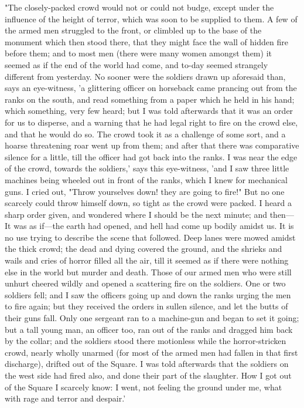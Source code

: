 "The closely-packed crowd would not or could not budge, except under the
influence of the height of terror, which was soon to be supplied to
them. A few of the armed men struggled to the front, or climbled up to
the base of the monument which then stood there, that they might face
the wall of hidden fire before them; and to most men (there were many
women amongst them) it seemed as if the end of the world had come, and
to-day seemed strangely different from yesterday. No sooner were the
soldiers drawn up aforesaid than, says an eye-witness, 'a glittering
officer on horseback came prancing out from the ranks on the south, and
read something from a paper which he held in his hand; which something,
very few heard; but I was told afterwards that it was an order for us to
disperse, and a warning that he had legal right to fire on the crowd
else, and that he would do so. The crowd took it as a challenge of some
sort, and a hoarse threatening roar went up from them; and after that
there was comparative silence for a little, till the officer had got
back into the ranks. I was near the edge of the crowd, towards the
soldiers,' says this eye-witness, 'and I saw three little machines being
wheeled out in front of the ranks, which I knew for mechanical guns. I
cried out, "Throw yourselves down! they are going to fire!" But no one
scarcely could throw himself down, so tight as the crowd were packed. I
heard a sharp order given, and wondered where I should be the next
minute; and then---It was as if---the earth had opened, and hell had
come up bodily amidst us. It is no use trying to describe the scene that
followed. Deep lanes were mowed amidst the thick crowd; the dead and
dying covered the ground, and the shrieks and wails and cries of horror
filled all the air, till it seemed as if there were nothing else in the
world but murder and death. Those of our armed men who were still unhurt
cheered wildly and opened a scattering fire on the soldiers. One or two
soldiers fell; and I saw the officers going up and down the ranks urging
the men to fire again; but they received the orders in sullen silence,
and let the butts of their guns fall. Only one sergeant ran to a
machine-gun and began to set it going; but a tall young man, an officer
too, ran out of the ranks and dragged him back by the collar; and the
soldiers stood there motionless while the horror-stricken crowd, nearly
wholly unarmed (for most of the armed men had fallen in that first
discharge), drifted out of the Square. I was told afterwards that the
soldiers on the west side had fired also, and done their part of the
slaughter. How I got out of the Square I scarcely know: I went, not
feeling the ground under me, what with rage and terror and despair.'

